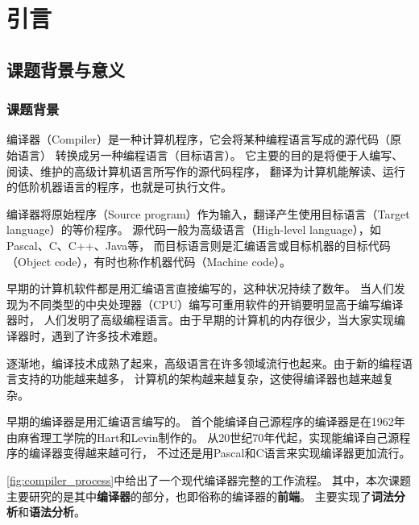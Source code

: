 \chapter{引言}\label{ch:background}

\section{课题背景与意义}\label{sec:purpose}

\subsection{课题背景}
编译器（Compiler）是一种计算机程序，它会将某种编程语言写成的源代码（原始语言）
转换成另一种编程语言（目标语言）。
它主要的目的是将便于人编写、阅读、维护的高级计算机语言所写作的源代码程序，
翻译为计算机能解读、运行的低阶机器语言的程序，也就是可执行文件。

编译器将原始程序（Source program）作为输入，翻译产生使用目标语言（Target language）的等价程序。
源代码一般为高级语言（High-level language），如Pascal、C、C++、Java等，
而目标语言则是汇编语言或目标机器的目标代码（Object code），有时也称作机器代码（Machine code）。

早期的计算机软件都是用汇编语言直接编写的，这种状况持续了数年。
当人们发现为不同类型的中央处理器（CPU）编写可重用软件的开销要明显高于编写编译器时，
人们发明了高级编程语言。由于早期的计算机的内存很少，当大家实现编译器时，遇到了许多技术难题。

逐渐地，编译技术成熟了起来，高级语言在许多领域流行也起来。由于新的编程语言支持的功能越来越多，
计算机的架构越来越复杂，这使得编译器也越来越复杂。

早期的编译器是用汇编语言编写的。
首个能编译自己源程序的编译器是在1962年由麻省理工学院的Hart和Levin制作的。
从20世纪70年代起，实现能编译自己源程序的编译器变得越来越可行，
不过还是用Pascal和C语言来实现编译器更加流行。

\autoref{fig:compiler_process}中给出了一个现代编译器完整的工作流程。
其中，本次课题主要研究的是其中{\bf 编译器}的部分，也即俗称的编译器的{\bf 前端}。
主要实现了{\bf 词法分析}和{\bf 语法分析}。

